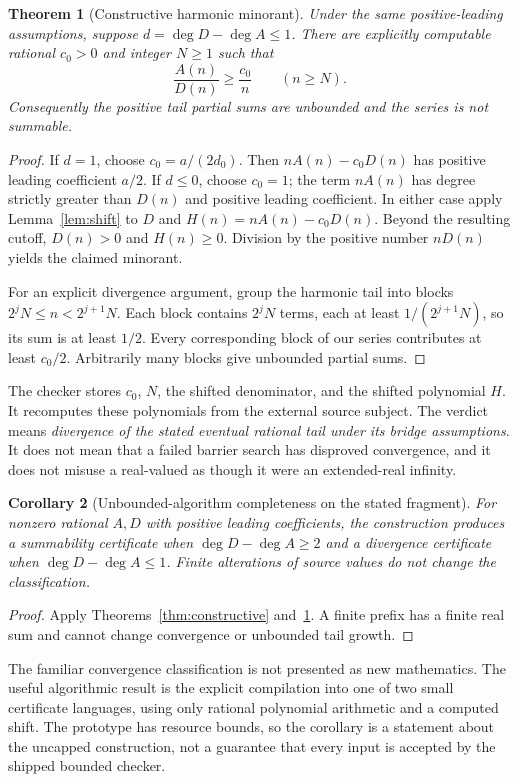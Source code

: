 \documentclass[11pt,a4paper]{article}
\newtheorem{theorem}{Theorem}[section]
\newtheorem{corollary}[theorem]{Corollary}
\theoremstyle{definition}\newtheorem{definition}[theorem]{Definition}
\newcommand{\code}[1]{\texttt{\detokenize{#1}}}
\begin{document}
\begin{theorem}[Constructive harmonic minorant]\label{thm:diverge}
Under the same positive-leading assumptions, suppose
$d=\deg D-\deg A\le1$. There are explicitly computable rational $c_0>0$
and integer $N\ge1$ such that
\[
 \frac{A(n)}{D(n)}\ge\frac{c_0}{n}\qquad(n\ge N).
\]
Consequently the positive tail partial sums are unbounded and the series is not
summable.
\end{theorem}
\begin{proof}
If $d=1$, choose $c_0=a/(2d_0)$. Then $nA(n)-c_0D(n)$ has positive
leading coefficient $a/2$. If $d\le0$, choose $c_0=1$; the term $nA(n)$
has degree strictly greater than $D(n)$ and positive leading coefficient.
In either case apply Lemma~\ref{lem:shift} to $D$ and
$H(n)=nA(n)-c_0D(n)$. Beyond the resulting cutoff, $D(n)>0$ and $H(n)\ge0$.
Division by the positive number $nD(n)$ yields the claimed minorant.

For an explicit divergence argument, group the harmonic tail into blocks
$2^jN\le n<2^{j+1}N$. Each block contains $2^jN$ terms, each at least
$1/(2^{j+1}N)$, so its sum is at least $1/2$. Every corresponding block of
our series contributes at least $c_0/2$. Arbitrarily many blocks give
unbounded partial sums.
\end{proof}

The checker stores $c_0$, $N$, the shifted denominator, and the shifted
polynomial $H$. It recomputes these polynomials from the external source
subject. The verdict means \emph{divergence of the stated eventual rational
tail under its bridge assumptions}. It does not mean that a failed barrier
search has disproved convergence, and it does not misuse a real-valued
\code{tsum} as though it were an extended-real infinity.

\begin{corollary}[Unbounded-algorithm completeness on the stated fragment]
For nonzero rational $A,D$ with positive leading coefficients, the construction
produces a summability certificate when $\deg D-\deg A\ge2$ and a divergence
certificate when $\deg D-\deg A\le1$. Finite alterations of source values do
not change the classification.
\end{corollary}
\begin{proof}
Apply Theorems~\ref{thm:constructive} and~\ref{thm:diverge}. A finite prefix
has a finite real sum and cannot change convergence or unbounded tail growth.
\end{proof}

The familiar convergence classification is not presented as new mathematics.
The useful algorithmic result is the explicit compilation into one of two
small certificate languages, using only rational polynomial arithmetic and a
computed shift. The prototype has resource bounds, so the corollary is a
statement about the uncapped construction, not a guarantee that every input is
accepted by the shipped bounded checker.
\end{document}
